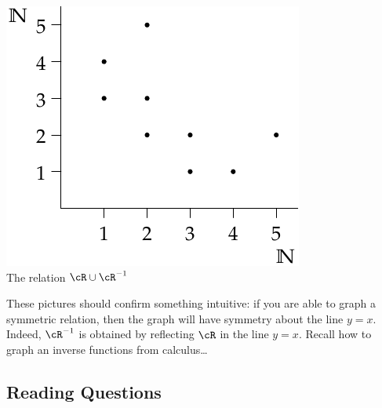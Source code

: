 \begin{center}
\begin{minipage}{0.35\textwidth}
\includegraphics[width=\textwidth]{relations-04-relnun}\\
The relation $\cR\cup \cR^{-1}$
\end{minipage}
\end{center}

\noindent These pictures should confirm something intuitive: if you are able to graph a symmetric relation, then the graph will have symmetry about the line $y=x$. Indeed, $\cR^{-1}$ is obtained by reflecting $\cR$ in the line $y=x$. Recall how to graph an inverse functions from calculus\ldots



\subsection*{Reading Questions}

